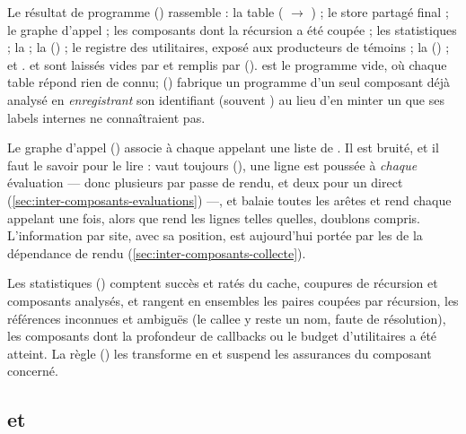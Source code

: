 Le résultat de programme () rassemble : la table
 ( $\to$ ) ; le store partagé final ; le
graphe d'appel ; les composants dont la récursion a été coupée ; les statistiques ; la
 ; la  () ; le registre des utilitaires, exposé aux
producteurs de témoins ; la  () ; et .
 et  sont laissés vides par  et remplis
par  ().  est \og le
programme vide\fg, où chaque table répond \og rien de connu\fg ; 
() fabrique un programme d'un seul composant déjà
analysé en \emph{enregistrant} son identifiant (souvent ) au lieu d'en minter
un que ses labels internes ne connaîtraient pas.

Le graphe d'appel () associe à chaque appelant une
liste de . Il est bruité, et il faut le savoir pour
le lire :  vaut toujours  (), une
ligne est poussée à \emph{chaque} évaluation --- donc plusieurs par passe de rendu, et deux
pour un  direct (\cref{sec:inter-composants-evaluations}) ---, et
 balaie toutes les arêtes et rend chaque appelant une fois, alors que
 rend les lignes telles quelles, doublons compris.
L'information par site, avec sa position, est aujourd'hui portée par les  de
la dépendance de rendu (\cref{sec:inter-composants-collecte}).

Les statistiques  () comptent
succès et ratés du cache, coupures de récursion et composants analysés, et rangent en ensembles
les paires  coupées par récursion, les références inconnues et
ambiguës (le callee y reste un nom, faute de résolution), les composants dont la profondeur de
callbacks ou le budget d'utilitaires a été atteint. La règle 
() les transforme en \Info{} et suspend les
assurances du composant concerné.

\subsection{ et }


